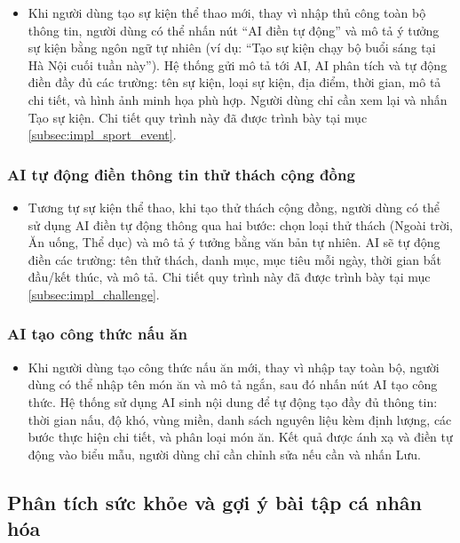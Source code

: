 \begin{itemize}
    \item Khi người dùng tạo sự kiện thể thao mới, thay vì nhập thủ công toàn bộ thông tin, người dùng có thể nhấn nút ``AI điền tự động'' và mô tả ý tưởng sự kiện bằng ngôn ngữ tự nhiên (ví dụ: ``Tạo sự kiện chạy bộ buổi sáng tại Hà Nội cuối tuần này''). Hệ thống gửi mô tả tới AI, AI phân tích và tự động điền đầy đủ các trường: tên sự kiện, loại sự kiện, địa điểm, thời gian, mô tả chi tiết, và hình ảnh minh họa phù hợp. Người dùng chỉ cần xem lại và nhấn Tạo sự kiện. Chi tiết quy trình này đã được trình bày tại mục \ref{subsec:impl_sport_event}.
\end{itemize}

\subsubsection{AI tự động điền thông tin thử thách cộng đồng}

\begin{itemize}
    \item Tương tự sự kiện thể thao, khi tạo thử thách cộng đồng, người dùng có thể sử dụng AI điền tự động thông qua hai bước: chọn loại thử thách (Ngoài trời, Ăn uống, Thể dục) và mô tả ý tưởng bằng văn bản tự nhiên. AI sẽ tự động điền các trường: tên thử thách, danh mục, mục tiêu mỗi ngày, thời gian bắt đầu/kết thúc, và mô tả. Chi tiết quy trình này đã được trình bày tại mục \ref{subsec:impl_challenge}.
\end{itemize}

\subsubsection{AI tạo công thức nấu ăn}

\begin{itemize}
    \item Khi người dùng tạo công thức nấu ăn mới, thay vì nhập tay toàn bộ, người dùng có thể nhập tên món ăn và mô tả ngắn, sau đó nhấn nút AI tạo công thức. Hệ thống sử dụng AI sinh nội dung để tự động tạo đầy đủ thông tin: thời gian nấu, độ khó, vùng miền, danh sách nguyên liệu kèm định lượng, các bước thực hiện chi tiết, và phân loại món ăn. Kết quả được ánh xạ và điền tự động vào biểu mẫu, người dùng chỉ cần chỉnh sửa nếu cần và nhấn Lưu.
\end{itemize}

\subsection{Phân tích sức khỏe và gợi ý bài tập cá nhân hóa}
\label{subsec:impl_ai_health_suggest}

